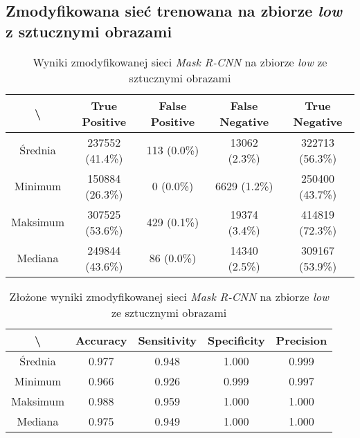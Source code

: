 \subsection{Zmodyfikowana sieć trenowana na zbiorze \textit{low} z sztucznymi obrazami}
\lowprocent

\begin{table}[H]
	\centering
	\caption{Wyniki zmodyfikowanej sieci \textit{Mask R-CNN} na zbiorze \textit{low} ze sztucznymi obrazami}
	\vspace{6pt}
	{\footnotesize
		\begin{tabular}{|c|c|c|c|c|}
      \hline \textbackslash & True Positive & False Positive & False Negative & True Negative \\
      \hline Średnia & 237552 (41.4\%) & 113 (0.0\%) & 13062 (2.3\%) & 322713 (56.3\%) \\
      \hline Minimum & 150884 (26.3\%) & 0 (0.0\%) & 6629 (1.2\%) & 250400 (43.7\%) \\
      \hline Maksimum & 307525 (53.6\%) & 429 (0.1\%) & 19374 (3.4\%) & 414819 (72.3\%) \\
      \hline Mediana & 249844 (43.6\%) & 86 (0.0\%) & 14340 (2.5\%) & 309167 (53.9\%) \\
      \hline
		\end{tabular}
	}
  \vspace{0pt}
  \label{Tab:low_modified_generated}
\end{table}


\begin{table}[H]
	\centering
	\caption{Złożone wyniki zmodyfikowanej sieci \textit{Mask R-CNN} na zbiorze \textit{low} ze sztucznymi obrazami}
	\vspace{6pt}
	{\footnotesize
		\begin{tabular}{|c|c|c|c|c|}
      \hline \textbackslash & Accuracy & Sensitivity & Specificity & Precision \\
      \hline Średnia & 0.977 & 0.948 & 1.000 & 0.999 \\
      \hline Minimum & 0.966 & 0.926 & 0.999 & 0.997 \\
      \hline Maksimum & 0.988 & 0.959 & 1.000 & 1.000 \\
      \hline Mediana & 0.975 & 0.949 & 1.000 & 1.000 \\
      \hline
		\end{tabular}
	}
  \vspace{0pt}
  \label{Tab:low_modified_generated_calculated}
\end{table}


